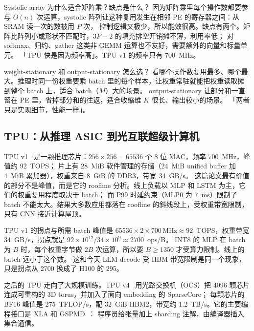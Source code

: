\begin{qa}{Systolic array 为什么适合矩阵乘？缺点是什么？}
\ans 因为矩阵乘里每个操作数都要参与 $O(n)$ 次运算，systolic 阵列让这种复用发生在相邻 PE 的寄存器之间：从 SRAM 读一次的数被用 $P$ 次，
控制逻辑又极少，所以能效很高。缺点有两个。矩阵比阵列小或形状不匹配时，$3P-2$ 的填充排空开销摊不薄，利用率低；
对 softmax、归约、gather 这类非 GEMM 运算也不友好，需要额外的向量和标量单元。
\wrong 「TPU 快是因为频率高」。TPU v1 的频率只有 700~MHz。
\end{qa}

\begin{qa}{weight-stationary 和 output-stationary 怎么选？}
\ans 看哪个操作数复用最多、哪个最大。推理时同一份权重要乘 batch 里的每个样本，让权重常驻就能把权重读取摊到整个 batch 上，适合 batch（$M$）大的场景。
output-stationary 让部分和一直留在 PE 里，省掉部分和的往返，适合收缩维 $K$ 很长、输出较小的场景。
\wrong 「两者只是实现细节，性能一样」。
\end{qa}

\subsection{TPU：从推理 ASIC 到光互联超级计算机}

TPU v1~\cite{jouppi2017tpu} 是一颗推理芯片：$256\times256=65536$ 个 8 位 MAC，频率 700~MHz，峰值约 92~TOPS；
片上有 28~MiB 软件管理的存储（24~MiB unified buffer 加 4~MiB 累加器），权重来自 8~GiB 的 DDR3，带宽 34~GB/s。
这篇论文最有价值的部分不是峰值，而是它的 roofline 分析。线上负载以 MLP 和 LSTM 为主，它们的权重复用程度取决于 batch；
而 P99 时延约束（MLP0 为 7~ms）限制了 batch 不能太大。结果大多数应用都落在 roofline 的斜线段上，受权重带宽限制，只有 CNN 接近计算屋顶。

\begin{est}{TPU v1 的拐点与所需 batch}
峰值是 $65536\times2\times700\,\text{MHz}\approx92$~TOPS，权重带宽 34~GB/s，拐点就是 $92\times10^{12}/34\times10^{9}\approx2700$~ops/B。
INT8 的 MLP 在 batch 为 $B$ 时，每个权重字节做 $2B$ 次运算，所以要 $B\ge1350$ 才受算力限制。线上的 batch 远小于这个数。
这和今天 LLM decode 受 HBM 带宽限制是同一个现象，只是拐点从 2700 换成了 H100 的 295。
\end{est}

之后的 TPU 走向了大规模训练。TPU v4~\cite{jouppi2023tpuv4} 用光路交换机（OCS）把 4096 颗芯片连成可重构的 3D torus，并加入了面向 embedding 的 SparseCore；
每颗芯片的 BF16 峰值是 275~TFLOP/s，配 32~GiB HBM2，带宽约 1.2~TB/s。它的主要编程接口是 XLA 和 GSPMD~\cite{xu2021gspmd}：
程序员给张量加上 sharding 注解，由编译器插入集合通信。

